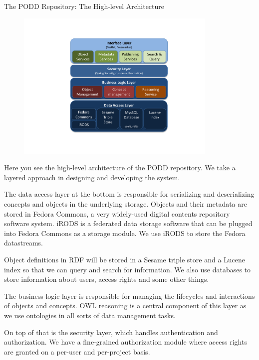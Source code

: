 \documentclass[ignorenonframetext,compress]{beamer}
\begin{document}
\begin{frame}{The PODD Repository: The High-level Architecture}
\vspace{-10pt}
 \begin{figure}[t]
  \begin{center}
  \includegraphics[trim=48mm 30mm 38mm 20mm, clip, width=96mm]{architecture.pdf}
   \end{center}
  \label{fig:arch}
 \end{figure}
\end{frame}

Here you see the high-level architecture of the PODD repository. 
We take a layered approach in designing and developing the system.

The data access layer at the bottom is responsible for 
serializing and deserializing concepts and objects in 
the underlying storage. Objects and their metadata are
stored in Fedora Commons, a very widely-used digital
contents repository software system. iRODS is a federated 
data storage software that can be plugged into Fedora
Commons as a storage module. We use iRODS to store the
Fedora datastreams.

Object definitions in RDF will be stored in a Sesame triple 
store and a Lucene index so that we can query and search for
information. We also use databases to store information
about users, access rights and some other things.

The business logic layer is responsible for managing the 
lifecycles and interactions of objects and concepts. OWL
reasoning is a central component of this layer as we use
ontologies in all sorts of data management tasks.

On top of that is the security layer, which handles authentication
and authorization. We have a fine-grained authorization module
where access rights are granted on a per-user and per-project basis.
\end{document}
